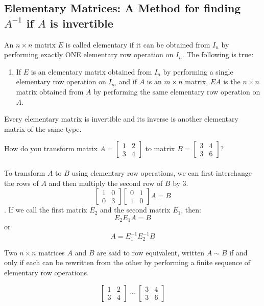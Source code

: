 \documentclass[12pt]{article}
\begin{document}
\subsection{Elementary Matrices: A Method for finding $A^{-1}$ if $A$ is invertible} 
An $n \times n$ matrix $E$ is called elementary if it can be obtained from $I_n$ by performing exactly ONE elementary row operation on $I_n$. \newline
The following is true: \begin{enumerate} 
\item If $E$ is an elementary matrix obtained from $I_n$ by performing a single elementary row operation on $I_m$ and if $A$ is an $m \times n$ matrix, $EA$ is the $n \times n$ matrix obtained from $A$ by performing the same elementary row operation on $A$. \end{enumerate}
\begin{theorem} Every elementary matrix is invertible and its inverse is another elementary matrix of the same type. \end{theorem}
\begin{example} How do you transform matrix $A = \begin{bmatrix} 1 & 2 \\ 3 & 4 \end{bmatrix} $ to matrix $B = \begin{bmatrix} 3 & 4 \\ 3 & 6 \end{bmatrix} $? \\~\\
To transform $A$ to $B$ using elementary row operations, we can first interchange the rows of $A$ and then multiply the second row of $B$ by 3. $$ \begin{bmatrix} 1 & 0 \\ 0 & 3 \end{bmatrix} \begin{bmatrix} 0 & 1 \\ 1 & 0 \end{bmatrix} A = B $$. If we call the first matrix $E_2$ and the second matrix $E_1$, then: $$ E_2E_1A = B$$ or $$ A = E_1^{-1}E_2^{-1}B $$ \end{example}
Two $ n\times n$ matrices $A$ and $B$ are said to row equivalent, written $ A \sim B$ if and only if each can be rewritten from the other by performing a finite sequence of elementary row operations. 
\begin{example} $$ \begin{bmatrix} 1 & 2 \\ 3 & 4 \end{bmatrix} \sim \begin{bmatrix} 3 & 4 \\ 3 & 6 \end{bmatrix} $$ \end{example} 
\end{document}
